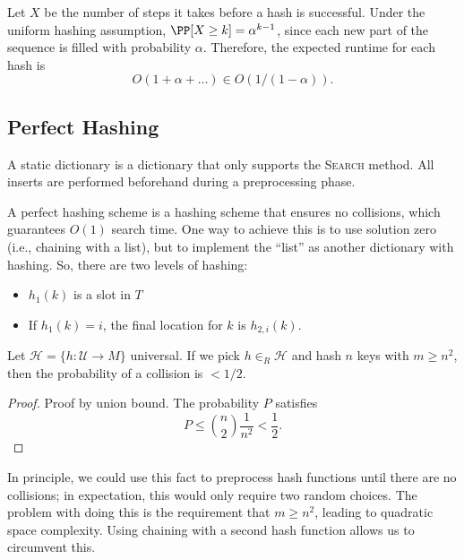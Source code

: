 Let $X$ be the number of steps it takes before a hash is successful. Under the uniform hashing assumption, $\PP[X\geq k]=\alpha^{k-1}$, since each new part of the sequence is filled with probability $\alpha$. Therefore, the expected runtime for each hash is 
\[O(1+\alpha+\hdots) \in O(1/(1-\alpha)).\] 

\subsection{Perfect Hashing}

\begin{definition}

A \ac{static dictionary} is a dictionary that only supports the \textsc{Search} method. All inserts are performed beforehand during a preprocessing phase. 
\end{definition}

A perfect hashing scheme is a hashing scheme that ensures no collisions, which guarantees $O(1)$ search time. One way to achieve this is to use solution zero (i.e., chaining with a list), but to implement the ``list'' as another dictionary with hashing. So, there are two levels of hashing:
\begin{itemize}
    \item $h_1(k)$ is a slot in $T$
    \item If $h_1(k)=i$, the final location for $k$ is $h_{2,i}(k)$. 
\end{itemize}

\begin{theorem}
\thmlabel

Let $\mathcal{H}=\{h: \mathcal{U}\rightarrow M\}$ universal. If we pick $h\in_R\mathcal{H}$ and hash $n$ keys with $m\geq n^2$, then the probability of a collision is $<1/2$.
\end{theorem}

\begin{proof}
Proof by union bound. The probability $P$ satisfies
\[P\leq \binom{n}{2}\frac{1}{n^2} < \frac{1}{2}.\]
\end{proof}

In principle, we could use this fact to preprocess hash functions until there are no collisions; in expectation, this would only require two random choices. The problem with doing this is the requirement that $m\geq n^2$, leading to quadratic space complexity. Using chaining with a second hash function allows us to circumvent this.

